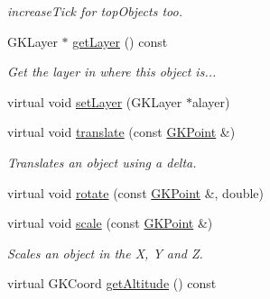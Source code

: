 \begin{DoxyCompactItemize}
\begin{DoxyCompactList}\small\item\em increase\+Tick for top\+Objects too. \end{DoxyCompactList}\item 
G\+K\+Layer $\ast$ \hyperlink{classGKGeoObject_a0ab06d03207c3f7094459283a9e524ed}{get\+Layer} () const \hypertarget{classGKGeoObject_a0ab06d03207c3f7094459283a9e524ed}{}\label{classGKGeoObject_a0ab06d03207c3f7094459283a9e524ed}

\begin{DoxyCompactList}\small\item\em Get the layer in where this object is... \end{DoxyCompactList}\item 
virtual void \hyperlink{classGKGeoObject_a2bc41c1436e19de5bd3938c5a57936c3}{set\+Layer} (G\+K\+Layer $\ast$alayer)
\item 
virtual void \hyperlink{classGKGeoObject_a353e80eb4751b336f3ea021032ac9bb0}{translate} (const \hyperlink{classGKPoint}{G\+K\+Point} \&)\hypertarget{classGKGeoObject_a353e80eb4751b336f3ea021032ac9bb0}{}\label{classGKGeoObject_a353e80eb4751b336f3ea021032ac9bb0}

\begin{DoxyCompactList}\small\item\em Translates an object using a delta. \end{DoxyCompactList}\item 
virtual void \hyperlink{classGKGeoObject_a51615728502012b8b4d168976bd89210}{rotate} (const \hyperlink{classGKPoint}{G\+K\+Point} \&, double)
\item 
virtual void \hyperlink{classGKGeoObject_aa7048ab8de03f02a167306922ab0b137}{scale} (const \hyperlink{classGKPoint}{G\+K\+Point} \&)\hypertarget{classGKGeoObject_aa7048ab8de03f02a167306922ab0b137}{}\label{classGKGeoObject_aa7048ab8de03f02a167306922ab0b137}

\begin{DoxyCompactList}\small\item\em Scales an object in the X, Y and Z. \end{DoxyCompactList}\item 
virtual G\+K\+Coord \hyperlink{classGKGeoObject_afcd83963b4e1eab7d5401cfc268ed4d2}{get\+Altitude} () const \hypertarget{classGKGeoObject_afcd83963b4e1eab7d5401cfc268ed4d2}{}\label{classGKGeoObject_afcd83963b4e1eab7d5401cfc268ed4d2}


\end{DoxyCompactItemize}

